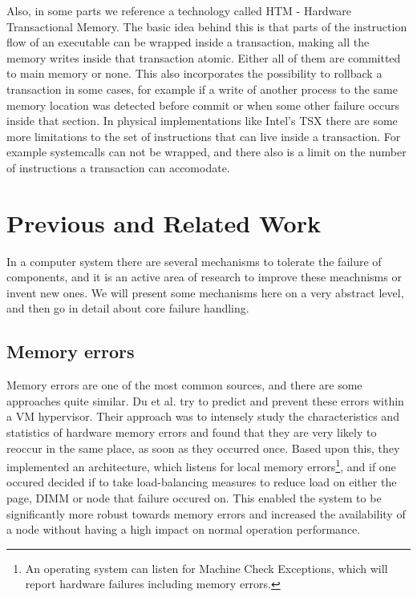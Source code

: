 \documentclass[a4paper,10pt,twoside]{article}
\begin{document}
Also, in some parts we reference a technology called HTM - Hardware Transactional Memory. The basic idea behind this is that parts of the instruction flow of an executable can be wrapped inside a transaction, making all the memory writes inside that transaction atomic. Either all of them are committed to main memory or none. This also incorporates the possibility to rollback a transaction in some cases, for example if a write of another process to the same memory location was detected before commit or when some other failure occurs inside that section. In physical implementations like Intel's TSX \cite{IntelTSX} there are some more limitations to the set of instructions that can live inside a transaction. For example systemcalls can not be wrapped, and there also is a limit on the number of instructions a transaction can accomodate.


\section{Previous and Related Work}
In a computer system there are several mechanisms to tolerate the failure of components, and it is an active area of research to improve these meachnisms or invent new ones. We will present some mechanisms here on a very abstract level, and then go in detail about core failure handling.


\subsection{Memory errors}
Memory errors are one of the most common sources, and there are some approaches quite similar. Du et al. \cite{MemErrPrediction} try to predict and prevent these errors within a VM hypervisor. Their approach was to intensely study the characteristics and statistics of hardware memory errors and found that they are very likely to reoccur in the same place, as soon as they occurred once. Based upon this, they implemented an architecture, which listens for local memory errors\footnote{An operating system can listen for Machine Check Exceptions, which will report hardware failures including memory errors.}, and if one occured decided if to take load-balancing measures to reduce load on either the page, DIMM or node that failure occured on. This enabled the system to be significantly more robust towards memory errors and increased the availability of a node without having a high impact on normal operation performance.
\end{document}
